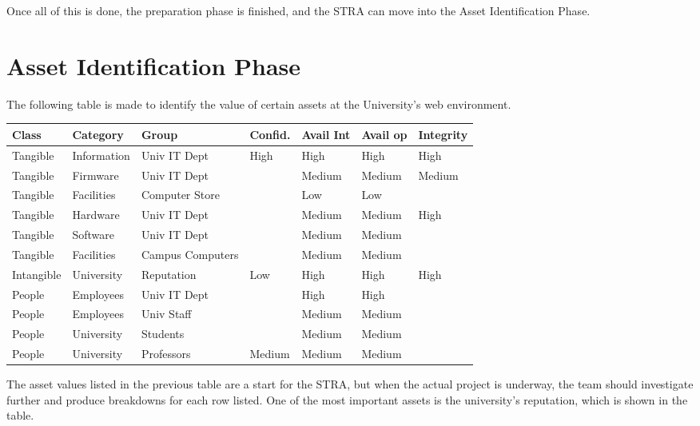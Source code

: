 \documentclass{article}
\numberwithin{equation}{section} %
\numberwithin{figure}{section} %
\numberwithin{table}{section} %
\begin{document}
Once all of this is done, the preparation phase is finished, and the STRA can move into the Asset Identification Phase.

\section{Asset Identification Phase}
The following table is made to identify the value of certain assets at the University's web environment.  

\begin{center}
    \begin{adjustwidth}{-1.1cm}{}
	    \begin{tabular}{ l | l | l |l  | l | l | l }
	    \hline
	    Class & Category & Group & Confid. & Avail Int & Avail op & Integrity \\
	    \hline\hline
	    Tangible & Information & Univ IT Dept & High & High & High & High \\
	    Tangible & Firmware & Univ IT Dept & & Medium & Medium & Medium \\
	    Tangible & Facilities & Computer Store & & Low & Low &  \\
	    Tangible & Hardware & Univ IT Dept &  & Medium & Medium & High \\
	    Tangible & Software & Univ IT Dept & & Medium & Medium &  \\
	    Tangible & Facilities & Campus Computers & & Medium & Medium &  \\
	    Intangible & University & Reputation & Low & High & High & High \\
	    People & Employees & Univ IT Dept & & High & High & \\
	    People & Employees & Univ Staff & & Medium & Medium & \\
	    People & University & Students & & Medium & Medium & \\
	    People & University & Professors & Medium & Medium & Medium & \\
	    \hline
	    \end{tabular}
    \end{adjustwidth}
\end{center}

The asset values listed in the previous table are a start for the STRA, but when the actual project is underway, the team should investigate further and produce breakdowns for each row listed.  One of the most important assets is the university's reputation, which is shown in the table.
\end{document}
